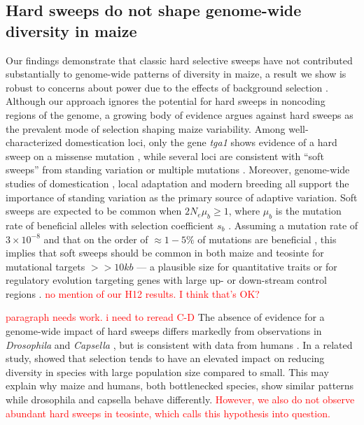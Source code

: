 \documentclass{pnastwo}
\newcommand{\jri}[1]{\textcolor{red}{\scriptsize #1}}
\begin{document}
\begin{article}
\subsection{Hard sweeps do not shape genome-wide diversity in maize}

Our findings demonstrate that classic hard selective sweeps have not contributed substantially to genome-wide patterns of diversity in maize, a result we show is robust to concerns about power due to the effects of background selection  \cite{enard2014}. 
Although our approach ignores the potential for hard sweeps in noncoding regions of the genome, a growing body of evidence argues against hard sweeps as the prevalent mode of selection shaping maize variability. 
Among well-characterized domestication loci, only the gene \emph{tga1} shows evidence of a hard sweep on a missense mutation \cite{wang2015}, while several loci are consistent with ``soft sweeps''  from standing variation \cite{studer2011,gallavotti2004role} or multiple mutations \cite{wills2013}. 
Moreover, genome-wide studies of domestication \cite{hufford2012},  local adaptation \cite{Takuno15062015} and modern breeding \cite{beissinger2014} all support the importance of standing variation as the primary source of adaptive variation. 
Soft sweeps are expected to be common when $2N_e\mu_b \ge 1$, where $\mu_b$ is the mutation rate of beneficial alleles with selection coefficient $s_b$ \cite{messer2013population}.  
Assuming a mutation rate of $3 \times 10^{-8}$ \citep{clark2005} and that on the order of $\approx 1-5\%$ of mutations are beneficial \citep{eyre2007distribution}, this implies that soft sweeps should be common in both maize and teosinte for mutational targets $>>10kb$ --- a plausible size for quantitative traits or for regulatory evolution targeting genes with large up- or down-stream control regions \citep[e.g.][]{studer2011}. \jri{no mention of our H12 results. I think that's OK?}

\jri{paragraph needs work. i need to reread C-D}
The absence of evidence for a genome-wide impact of hard sweeps differs markedly from observations in \emph{Drosophila} \cite{sattath2011} and \emph{Capsella} \cite{williamson2014}, but is consistent with data from humans \cite{hernandez2011,pritchard2010genetics}. 
In a related study, \cite{corbett2015} showed that selection tends to have an elevated impact on reducing diversity in species with large population size compared to small. This may explain why maize and humans, both bottlenecked species, show similar patterns while drosophila and capsella behave differently. \textcolor{red}{However, we also do not observe abundant hard sweeps in teosinte, which calls this hypothesis into question.}


\end{article}
\end{document}
